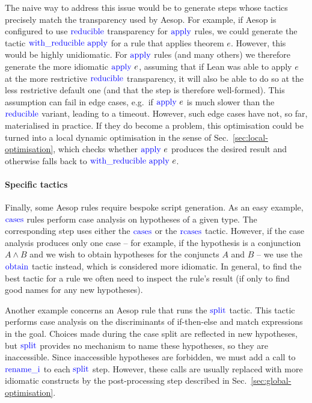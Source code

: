 \documentclass[sigplan,screen]{acmart}
\newcommand{\tac}[1]{\ensuremath{\mathrm{\mathcolor{blue}{#1}}}}
\begin{document}
The naive way to address this issue would be to generate steps whose tactics precisely match the transparency used by Aesop.
For example, if Aesop is configured to use \tac{reducible} transparency for \tac{apply} rules, we could generate the tactic $\tac{with\_reducible}~\tac{apply}$ for a rule that applies theorem $e$.
However, this would be highly unidiomatic.
For \tac{apply} rules (and many others) we therefore generate the more idiomatic $\tac{apply}~e$, assuming that if Lean was able to apply $e$ at the more restrictive \tac{reducible} transparency, it will also be able to do so at the less restrictive default one (and that the step is therefore well-formed).
This assumption can fail in edge cases, e.g.\ if $\tac{apply}~e$ is much slower than the \tac{reducible} variant, leading to a timeout.
However, such edge cases have not, so far, materialised in practice.
If they do become a problem, this optimisation could be turned into a local dynamic optimisation in the sense of Sec.~\ref{sec:local-optimisation}, which checks whether $\tac{apply}~e$ produces the desired result and otherwise falls back to $\tac{with\_reducible}~\tac{apply}~e$.

\paragraph{Specific tactics}
Finally, some Aesop rules require bespoke script generation.
As an easy example, \tac{cases} rules perform case analysis on hypotheses of a given type.
The corresponding step uses either the $\tac{cases}$ or the $\tac{rcases}$ tactic.
However, if the case analysis produces only one case -- for example, if the hypothesis is a conjunction $A ∧ B$ and we wish to obtain hypotheses for the conjuncts $A$ and $B$ -- we use the \tac{obtain} tactic instead, which is considered more idiomatic.
In general, to find the best tactic for a rule we often need to inspect the rule's result (if only to find good names for any new hypotheses).

Another example concerns an Aesop rule that runs the \tac{split} tactic.
This tactic performs case analysis on the discriminants of if-then-else and match expressions in the goal.
Choices made during the case split are reflected in new hypotheses, but \tac{split} provides no mechanism to name these hypotheses, so they are inaccessible.
Since inaccessible hypotheses are forbidden, we must add a call to \tac{rename\_i} to each \tac{split} step.
However, these calls are usually replaced with more idiomatic constructs by the post-processing step described in Sec.~\ref{sec:global-optimisation}.
\end{document}
